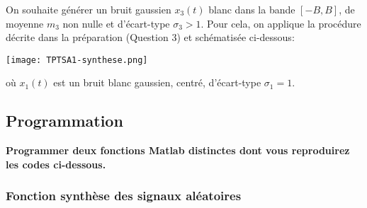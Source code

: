\documentclass{article}
\begin{document}
On souhaite générer un bruit gaussien $x_3(t)$ blanc dans la bande $[-B,B]$, de moyenne $m_3$ non nulle et d'écart-type $\sigma_3 > 1$. Pour cela, on applique la procédure décrite dans la préparation (Question 3) et schématisée ci-dessous:\\

\begin{center}
\texttt{[image: TPTSA1-synthese.png]}
\end{center}

où $x_1(t)$ est un bruit blanc gaussien, centré, d'écart-type $\sigma_1=1$.

\subsection{Programmation}

\textbf{Programmer deux fonctions Matlab distinctes dont vous reproduirez  les codes ci-dessous.}

\subsubsection{Fonction synthèse des signaux aléatoires}
\end{document}
